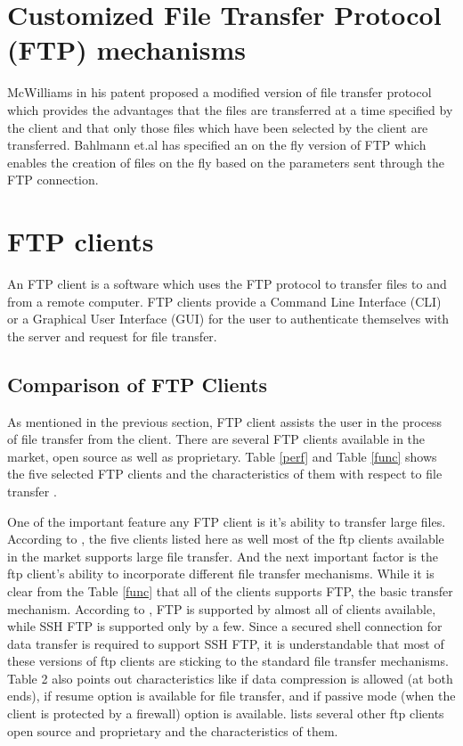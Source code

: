 \documentclass[9pt,twocolumn,twoside]{styles/osajnl}
\begin{document}
\section{Customized File Transfer Protocol (FTP) mechanisms}
McWilliams in his patent \cite{mcwilliams2001high} proposed a modified version of file transfer protocol which provides the advantages that the files are transferred at a time specified by the client and that only those files which have been selected by the client are transferred. Bahlmann et.al  has specified an on the fly version of FTP \cite{bahlmann2001fly} which enables the creation of files on the fly based on the parameters sent through the FTP connection.

\section{FTP clients}
An FTP client is a software which uses the FTP protocol to transfer files to and from a remote computer. FTP clients provide a Command Line Interface (CLI) or a Graphical User Interface (GUI) for the user to authenticate themselves with the server and request for file transfer.
\subsection{Comparison of FTP Clients}
As mentioned in the previous section, FTP client assists the user in the process of file transfer from the client. There are several FTP clients available in the market, open source as well as proprietary. Table \ref{perf} and Table \ref{func} shows the five selected FTP clients and the characteristics of them with respect to file transfer \cite{www-wiki-ftpclientcomp}.

One of the important feature any FTP client is it's ability to transfer large files. According to \cite{www-wiki-ftpclientcomp}, the five clients listed here as well most of the ftp clients available in the market supports large file transfer. And the next important factor is the ftp client's ability to incorporate different file transfer mechanisms. While it is clear from the Table \ref{func} that all of the clients supports FTP, the basic transfer mechanism. According to \cite{www-wiki-ftpclientcomp}, FTP is supported by almost all of clients available, while SSH FTP is supported only by a few. Since a secured shell connection for data transfer is required to support SSH FTP, it is understandable that most of these versions of ftp clients are sticking to the standard file transfer mechanisms. Table 2 also points out characteristics like if data compression is allowed (at both ends), if resume option is available for file transfer, and if passive mode (when the client is protected by a firewall) option is available. \cite{www-wiki-ftpclientcomp} lists several other ftp clients open source and proprietary and the characteristics of them.
\end{document}
